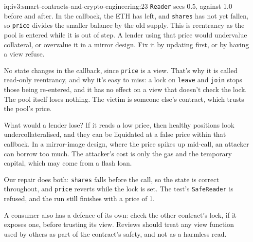\begin{solution}{iq:iv3:smart-contracts-and-crypto-engineering:23}
\texttt{Reader} sees 0.5, against 1.0 before and after. In the callback, the ETH has left, and \texttt{shares} has not yet fallen, so \texttt{price} divides the smaller balance by the old supply. This is reentrancy as the pool is entered while it is out of step. A lender using that price would undervalue collateral, or overvalue it in a mirror design. Fix it by updating first, or by having a view refuse.

No state changes in the callback, since \texttt{price} is a view. That's why it is called read-only reentrancy, and why it's easy to miss: a lock on \texttt{leave} and \texttt{join} stops those being re-entered, and it has no effect on a view that doesn't check the lock. The pool itself loses nothing. The victim is someone else's contract, which trusts the pool's price.

What would a lender lose? If it reads a low price, then healthy positions look undercollateralised, and they can be liquidated at a false price within that callback. In a mirror-image design, where the price spikes up mid-call, an attacker can borrow too much. The attacker's cost is only the gas and the temporary capital, which may come from a flash loan.

Our repair does both: \texttt{shares} falls before the call, so the state is correct throughout, and \texttt{price} reverts while the lock is set. The test's \texttt{SafeReader} is refused, and the run still finishes with a price of 1.

A consumer also has a defence of its own: check the other contract's lock, if it exposes one, before trusting its view. Reviews should treat any view function used by others as part of the contract's safety, and not as a harmless read.

\end{solution}

